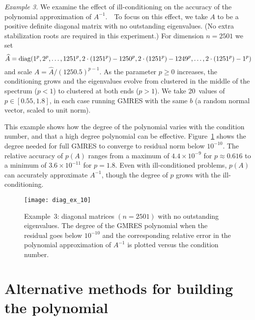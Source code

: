 \documentclass{siamart}
\begin{document}

{\it Example 3.}  We examine the effect of ill-conditioning on the accuracy of the polynomial approximation of $A^{-1}$.\ \  To focus on this effect, we take $A$ to be a positive definite diagonal matrix with no outstanding eigenvalues.  (No extra stabilization roots are required in this experiment.)  For dimension $n=2501$ we set
\[ \widehat{A} = {\rm diag}(1^p, 2^p, \ldots, 1251^p, 2\cdot (1251^p)-1250^p, 2\cdot (1251^p)-1249^p, \ldots, 2\cdot(1251^p) - 1^p)\]
and scale $A = \widehat{A}/(1250.5)^{p-1}$.
As the parameter $p\ge 0$ increases, the conditioning grows and the eigenvalues evolve from clustered in the middle of the spectrum ($p<1$) to clustered at both ends ($p>1$).
We take 20~values of $p\in [0.55,1.8]$, in each case running GMRES with the same $b$ (a random normal vector, scaled to unit norm).

This example shows how the degree of the polynomial varies with the condition number, and that a high degree polynomial can be effective.  
Figure~\ref{fig:polydegr} shows the degree needed for full GMRES to converge to residual norm below $10^{-10}$.  
The relative accuracy of $p(A)$ ranges from a maximum of $4.4\times 10^{-9}$ for $p\approx 0.616$ to a minimum of $3.6\times 10^{-11}$ for $p=1.8$.
Even with ill-conditioned problems, $p(A)$ can accurately approximate $A^{-1}$, though the degree of $p$ grows with the ill-conditioning.

\begin{figure}
\begin{center}
\texttt{[image: diag\_ex\_10]}
\end{center}

\vspace*{-5pt}
\caption{Example~3:  diagonal matrices $(n=2501)$ with no outstanding eigenvalues.  The degree of the GMRES polynomial when the residual goes below $10^{-10}$ and the corresponding relative error in the polynomial approximation of $A^{-1}$ is plotted versus the condition number.}
\label{fig:polydegr}
\end{figure}



\section{Alternative methods for building the polynomial} \label{sec:alt}
\end{document}
